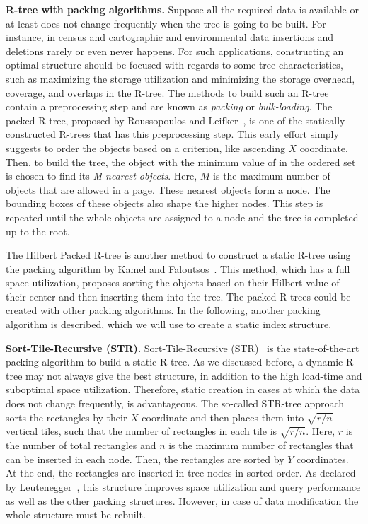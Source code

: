 \documentclass[a4paper,12pt]{article}
\begin{document}
\textbf{R-tree with packing algorithms.}
Suppose all the required data is available or at least does not change frequently when the tree is going to be built. For instance, in census and cartographic and environmental data insertions and deletions rarely or even never happens. 
For such applications, constructing an optimal structure should be focused with regards to some tree characteristics, such as maximizing the storage utilization and minimizing the storage overhead, coverage, and overlaps in the R-tree. The methods to build such an R-tree contain a preprocessing step and are known as \textit{packing} or \textit{bulk-loading}. 
The packed R-tree, proposed by Roussopoulos and Leifker~\cite{packedrtree, packedrtree2}, is one of the statically constructed R-trees that has this preprocessing step. This early effort simply suggests to order the objects based on a criterion, like ascending $X$ coordinate. Then, to build the tree, the object with the minimum value of in the ordered set is chosen to find its \textit{M nearest objects}. Here, $M$ is the maximum number of objects that are allowed in a page. These nearest objects form a node. The bounding boxes of these objects also shape the higher nodes. This step is repeated until the whole objects are assigned to a node and the tree is completed up to the root.

The Hilbert Packed R-tree is another method to construct a static R-tree using the packing algorithm by Kamel and Faloutsos~\cite{hilbert-rtree}. This method, which has a full space utilization, proposes sorting the objects based on their Hilbert value of their center and then inserting them into the tree.
The packed R-trees could be created with other packing algorithms. In the following, another packing algorithm is described, which we will use to create a static index structure.

\textbf{Sort-Tile-Recursive (STR).} Sort-Tile-Recursive (STR)~\cite{strtree} is the state-of-the-art packing algorithm to build a static R-tree. As we discussed before, a dynamic R-tree may not always give the best structure, in addition to the high load-time and suboptimal space utilization. Therefore, static creation in cases at which the data does not change frequently, is advantageous. The so-called STR-tree approach sorts the rectangles by their $X$ coordinate and then places them into $\sqrt{r/n}$ vertical tiles, such that the number of rectangles in each tile is $\sqrt{r/n}$. Here, $r$ is the number of total rectangles and $n$ is the maximum number of rectangles that can be inserted in each node. Then, the rectangles are sorted by $Y$ coordinates. At the end, the rectangles are inserted in tree nodes in sorted order.
As declared by Leutenegger~\cite{strtree}, this structure improves space utilization and query performance as well as the other packing structures. However, in case of data modification the whole structure must be rebuilt.
\end{document}
